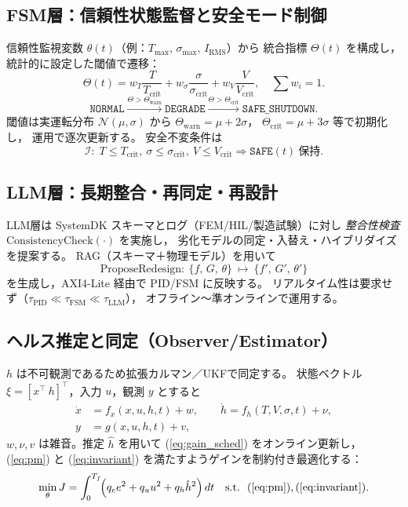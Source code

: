 \subsection{FSM層：信頼性状態監督と安全モード制御}
信頼性監視変数 $\theta(t)$（例：$T_{\max},\,\sigma_{\max},\,I_{\mathrm{RMS}}$）から
統合指標 $\Theta(t)$ を構成し，統計的に設定した閾値で遷移：
\begin{equation}
\Theta(t)=w_T\frac{T}{T_{\mathrm{crit}}}+w_\sigma\frac{\sigma}{\sigma_{\mathrm{crit}}}
+w_V\frac{V}{V_{\mathrm{crit}}},\quad \sum w_i=1.
\end{equation}
\[
\texttt{NORMAL}\xrightarrow{\Theta>\Theta_{\mathrm{warn}}}\texttt{DEGRADE}
\xrightarrow{\Theta>\Theta_{\mathrm{crit}}}\texttt{SAFE\_SHUTDOWN}.
\]
閾値は実運転分布 $\mathcal{N}(\mu,\sigma)$ から
$\Theta_{\mathrm{warn}}\!=\mu+2\sigma$，
$\Theta_{\mathrm{crit}}\!=\mu+3\sigma$ 等で初期化し，
運用で逐次更新する。
安全不変条件は
\begin{equation}
\mathcal{I}:\; T\!\le\!T_{\mathrm{crit}},\ \sigma\!\le\!\sigma_{\mathrm{crit}},\ V\!\le\!V_{\mathrm{crit}}
\Rightarrow \texttt{SAFE}(t)\ \text{保持}.
\label{eq:invariant}
\end{equation}

\subsection{LLM層：長期整合・再同定・再設計}
LLM層は SystemDK スキーマとログ（FEM/HIL/製造試験）に対し
\emph{整合性検査} $\mathrm{ConsistencyCheck}(\cdot)$ を実施し，
劣化モデルの同定・入替え・ハイブリダイズを提案する。
RAG（スキーマ＋物理モデル）を用いて
\[
\mathrm{ProposeRedesign}:\ \{f,\,G,\,\theta\}\ \mapsto\ \{f',\,G',\,\theta'\}
\]
を生成し，AXI4-Lite 経由で PID/FSM に反映する。
リアルタイム性は要求せず（$\tau_{\mathrm{PID}}\!\ll\!\tau_{\mathrm{FSM}}\!\ll\!\tau_{\mathrm{LLM}}$），
オフライン〜準オンラインで運用する。

\subsection{ヘルス推定と同定（Observer/Estimator）}
$h$ は不可観測であるため拡張カルマン／UKFで同定する。
状態ベクトル $\xi=[x^\top\ h]^\top$，入力 $u$，観測 $y$ とすると
\begin{align}
\dot{x} &= f_x(x,u,h,t) + w,\qquad
\dot{h} = f_h(T,V,\sigma,t) + \nu, \\
y &= g(x,u,h,t) + v,
\end{align}
$w,\nu,v$ は雑音。推定 $\hat{h}$ を用いて
(\ref{eq:gain_sched}) をオンライン更新し，
(\ref{eq:pm}) と (\ref{eq:invariant}) を満たすようゲインを制約付き最適化する：
\begin{equation}
\min_{\theta} J = \int_0^{T_f}\!\!\left(q_e e^2 + q_u u^2 + q_h \hat{h}^2\right)dt
\quad \text{s.t.}\ \ (\ref{eq:pm}),(\ref{eq:invariant}).
\end{equation}

